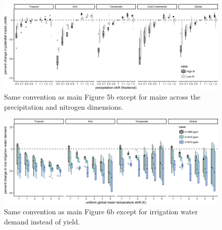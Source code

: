 \documentclass[10pt]{article}
\begin{document}
\begin{figure}[h!]
    \centering
    \includegraphics[width=\textwidth]{maize_sim_CG_N2.png}
    \caption{Same convention as main Figure 5b except for maize across the precipitation and nitrogen dimensions.}
    \label{fig:carbontemp}
\end{figure}

\begin{figure}[h!]
    \centering
    \includegraphics[width=\textwidth]{rice_sim_CG_irrwat.png}
    \caption{Same convention as main Figure 6b except for irrigation water demand instead of yield.}
    \label{fig:carbontemp}
\end{figure}
\end{document}
